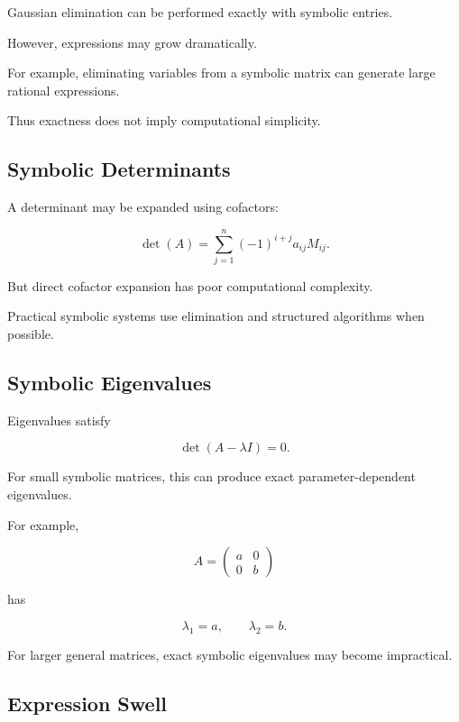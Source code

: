 Gaussian elimination can be performed exactly with symbolic entries.

However, expressions may grow dramatically.

For example, eliminating variables from a symbolic matrix can generate
large rational expressions.

Thus exactness does not imply computational simplicity.

\subsection{Symbolic Determinants}
\label{subsec:symbolic-determinants}

A determinant may be expanded using cofactors:

\[
\boxed{
\det(A)
=
\sum_{j=1}^{n}
(-1)^{i+j}
a_{ij}
M_{ij}.
}
\]

But direct cofactor expansion has poor computational complexity.

Practical symbolic systems use elimination and structured algorithms when
possible.

\subsection{Symbolic Eigenvalues}
\label{subsec:symbolic-eigenvalues}

Eigenvalues satisfy

\[
\boxed{
\det(A-\lambda I)=0.
}
\]

For small symbolic matrices, this can produce exact parameter-dependent
eigenvalues.

For example,

\[
A
=
\begin{pmatrix}
a&0\\
0&b
\end{pmatrix}
\]

has

\[
\boxed{
\lambda_1=a,
\qquad
\lambda_2=b.
}
\]

For larger general matrices, exact symbolic eigenvalues may become
impractical.

\subsection{Expression Swell}
\label{subsec:expression-swell}

